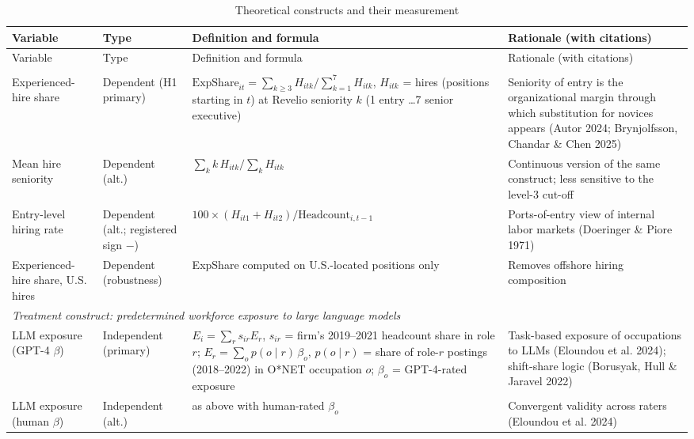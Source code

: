 \begingroup\scriptsize
\setlength{\tabcolsep}{3pt}
\begin{longtable}{p{2.3cm}p{1.35cm}p{6.3cm}p{5.2cm}}
\caption{Theoretical constructs and their measurement}\label{tab:construct}\\
\toprule
Variable & Type & Definition and formula & Rationale (with citations) \\
\midrule
\endfirsthead
\toprule
Variable & Type & Definition and formula & Rationale (with citations) \\
\midrule
\endhead
\bottomrule
\endfoot
\multicolumn{4}{l}{\textit{Outcome construct: experience tilt of hiring (firm $i$, year $t$)}}\\
Experienced-hire share & Dependent (H1 primary) & $\text{ExpShare}_{it}=\sum_{k\ge 3} H_{itk}/\sum_{k=1}^{7} H_{itk}$, $H_{itk}$ = hires (positions starting in $t$) at Revelio seniority $k$ (1 entry \ldots 7 senior executive) & Seniority of entry is the organizational margin through which substitution for novices appears (Autor 2024; Brynjolfsson, Chandar \& Chen 2025) \\
Mean hire seniority & Dependent (alt.) & $\sum_k k\,H_{itk}/\sum_k H_{itk}$ & Continuous version of the same construct; less sensitive to the level-3 cut-off \\
Entry-level hiring rate & Dependent (alt.; registered sign $-$) & $100\times(H_{it1}+H_{it2})/\text{Headcount}_{i,t-1}$ & Ports-of-entry view of internal labor markets (Doeringer \& Piore 1971) \\
Experienced-hire share, U.S. hires & Dependent (robustness) & ExpShare computed on U.S.-located positions only & Removes offshore hiring composition \\
\midrule
\multicolumn{4}{l}{\textit{Treatment construct: predetermined workforce exposure to large language models}}\\
LLM exposure (GPT-4 $\beta$) & Independent (primary) & $E_i=\sum_r s_{ir}E_r$, $s_{ir}$ = firm's 2019--2021 headcount share in role $r$; $E_r=\sum_o p(o\mid r)\,\beta_o$, $p(o\mid r)$ = share of role-$r$ postings (2018--2022) in O*NET occupation $o$; $\beta_o$ = GPT-4-rated exposure & Task-based exposure of occupations to LLMs (Eloundou et al. 2024); shift-share logic (Borusyak, Hull \& Jaravel 2022) \\
LLM exposure (human $\beta$) & Independent (alt.) & as above with human-rated $\beta_o$ & Convergent validity across raters (Eloundou et al. 2024) \\

\end{longtable}
